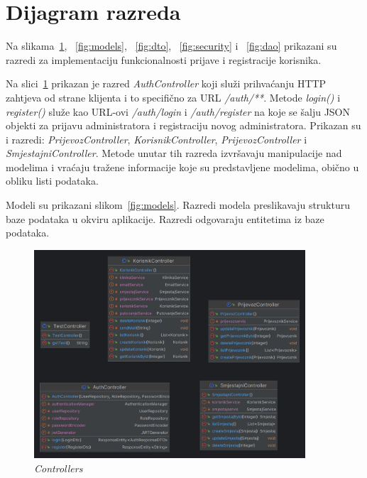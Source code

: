 			
			\eject
			
			
		\section{Dijagram razreda}
		

			Na slikama~\ref{fig:controllers}, ~\ref{fig:models}, ~\ref{fig:dto}, ~\ref{fig:security} i ~\ref{fig:dao}
			prikazani su razredi za implementaciju funkcionalnosti prijave i registracije korisnika.
			
			Na slici~\ref{fig:controllers} prikazan je razred \textit{AuthController} koji služi prihvaćanju HTTP zahtjeva od strane klijenta i to specifično za URL \textit{/auth/**}. Metode \textit{login()} i \textit{register()} služe kao URL-ovi \textit{/auth/login} i \textit{/auth/register} na koje se šalju JSON objekti za prijavu administratora i registraciju novog administratora. Prikazan su i razredi: \textit{PrijevozController}, \textit{KorisnikController},  \textit{PrijevozController} i \textit{SmjestajniController}. Metode unutar tih razreda izvršavaju manipulacije nad modelima i vraćaju tražene informacije koje su predstavljene modelima, obično u obliku listi podataka. 
			
			Modeli su prikazani slikom~\ref{fig:models}. Razredi modela preslikavaju strukturu baze podataka u okviru aplikacije. Razredi odgovaraju entitetima iz baze podataka.
			
			\begin{figure}[htbp]
				\centering
				\includegraphics[width=0.9\textwidth]{slike/controllers}
				\caption{\textit{Controllers}}
				\label{fig:controllers}
			\end{figure}
			
